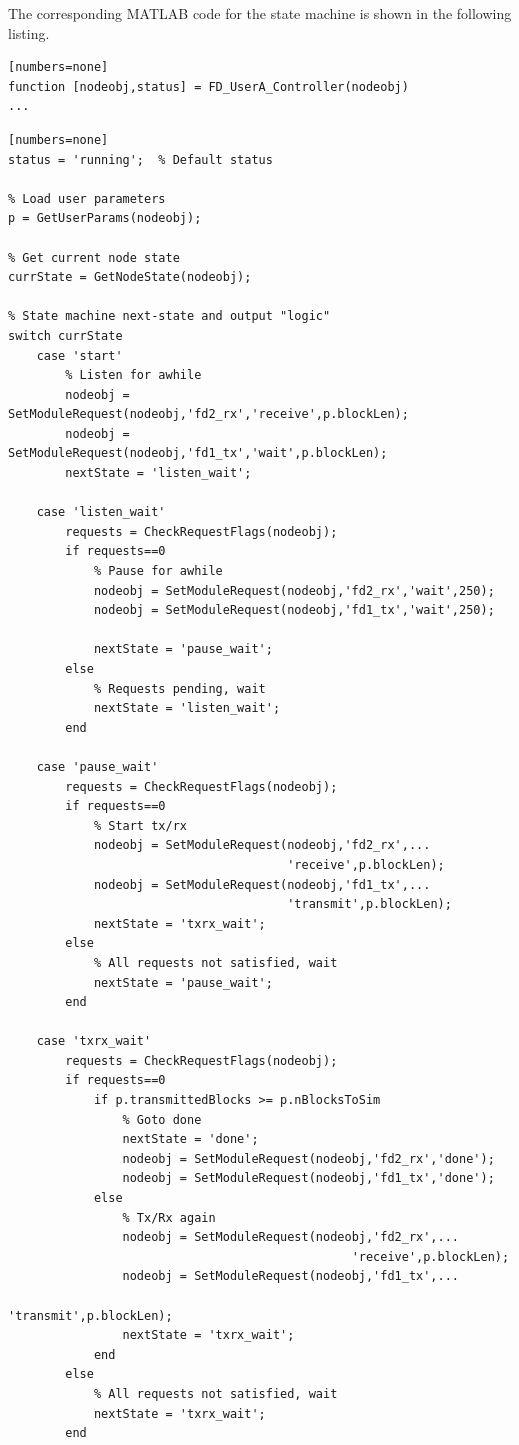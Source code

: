 The corresponding MATLAB code for the state machine is shown in the
following listing.

\begin{lstlisting}[name=fdController][numbers=none]
function [nodeobj,status] = FD_UserA_Controller(nodeobj)
...
\end{lstlisting}
\begin{lstlisting}[name=fdController, firstnumber=24][numbers=none]
status = 'running';  % Default status

% Load user parameters
p = GetUserParams(nodeobj);

% Get current node state
currState = GetNodeState(nodeobj);

% State machine next-state and output "logic"
switch currState
    case 'start'
        % Listen for awhile
        nodeobj = SetModuleRequest(nodeobj,'fd2_rx','receive',p.blockLen);
        nodeobj = SetModuleRequest(nodeobj,'fd1_tx','wait',p.blockLen);
        nextState = 'listen_wait';

    case 'listen_wait'
        requests = CheckRequestFlags(nodeobj);
        if requests==0
            % Pause for awhile
            nodeobj = SetModuleRequest(nodeobj,'fd2_rx','wait',250);
            nodeobj = SetModuleRequest(nodeobj,'fd1_tx','wait',250);

            nextState = 'pause_wait';
        else
            % Requests pending, wait
            nextState = 'listen_wait';
        end

    case 'pause_wait'
        requests = CheckRequestFlags(nodeobj);
        if requests==0
            % Start tx/rx
            nodeobj = SetModuleRequest(nodeobj,'fd2_rx',...
                                       'receive',p.blockLen);
            nodeobj = SetModuleRequest(nodeobj,'fd1_tx',...
                                       'transmit',p.blockLen);
            nextState = 'txrx_wait';
        else
            % All requests not satisfied, wait
            nextState = 'pause_wait';
        end

    case 'txrx_wait'
        requests = CheckRequestFlags(nodeobj);
        if requests==0
            if p.transmittedBlocks >= p.nBlocksToSim
                % Goto done
                nextState = 'done';
                nodeobj = SetModuleRequest(nodeobj,'fd2_rx','done');
                nodeobj = SetModuleRequest(nodeobj,'fd1_tx','done');
            else
                % Tx/Rx again
                nodeobj = SetModuleRequest(nodeobj,'fd2_rx',...
                                                'receive',p.blockLen);
                nodeobj = SetModuleRequest(nodeobj,'fd1_tx',...
                                                'transmit',p.blockLen);
                nextState = 'txrx_wait';
            end
        else
            % All requests not satisfied, wait
            nextState = 'txrx_wait';
        end


\end{lstlisting}
